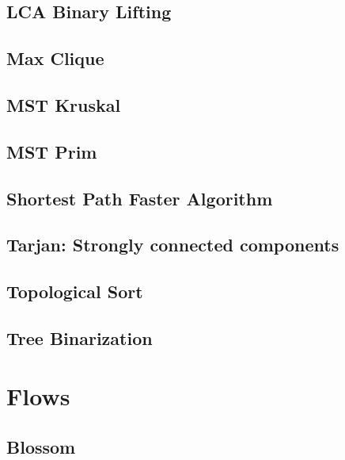 \subsection{LCA Binary Lifting}
\raggedbottom
\hrulefill
\subsection{Max Clique}
\raggedbottom
\hrulefill
\subsection{MST Kruskal}
\raggedbottom
\hrulefill
\subsection{MST Prim}
\raggedbottom
\hrulefill
\subsection{Shortest Path Faster Algorithm}
\raggedbottom
\hrulefill
\subsection{Tarjan: Strongly connected components}
\raggedbottom
\hrulefill
\subsection{Topological Sort}
\raggedbottom
\hrulefill
\subsection{Tree Binarization}
\raggedbottom
\hrulefill

\section{Flows}
\subsection{Blossom}
\raggedbottom
\hrulefill
